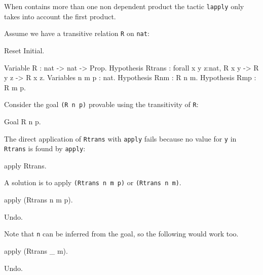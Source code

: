 \begin{coq_example*}
\begin{Variants}
  \Warning When {\term} contains more than one non
  dependent product the tactic {\tt lapply} only takes into account the
  first product.

\end{Variants}

\Example
Assume we have a transitive relation {\tt R} on {\tt nat}:
\label{eapply-example}

\begin{coq_eval}
Reset Initial.
\end{coq_eval}
\begin{coq_example*}
Variable R : nat -> nat -> Prop.
Hypothesis Rtrans : forall x y z:nat, R x y -> R y z -> R x z.
Variables n m p : nat.
Hypothesis Rnm : R n m.
Hypothesis Rmp : R m p.
\end{coq_example*}

Consider the goal {\tt (R n p)} provable using the transitivity of
{\tt R}:

\begin{coq_example*}
Goal R n p.
\end{coq_example*}

The direct application of {\tt Rtrans} with {\tt apply} fails because
no value for {\tt y} in {\tt Rtrans} is found by {\tt apply}:

\begin{coq_example}
apply Rtrans.
\end{coq_example}

A solution is to apply {\tt (Rtrans n m p)} or {\tt (Rtrans n m)}.

\begin{coq_example}
apply (Rtrans n m p).
\end{coq_example}

\begin{coq_eval}
Undo.
\end{coq_eval}

Note that {\tt n} can be inferred from the goal, so the following would
work too.

\begin{coq_example*}
apply (Rtrans _ m).
\end{coq_example*}
\begin{coq_eval}
Undo.
\end{coq_eval}


\end{coq_example*}
